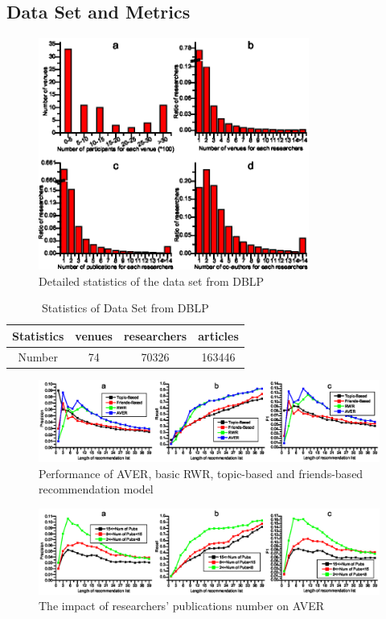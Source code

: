 \documentclass{sig-alternate-2013}
\begin{document}
\subsection{Data Set and Metrics}
\begin{figure}[t]
\centering
\includegraphics [width=3.5in]{Fig3.eps}
\caption{Detailed statistics of the data set from DBLP}
\label{fig3}
\end{figure}
\begin{table}
\renewcommand{\arraystretch}{1.2}
\centering
\caption{Statistics of Data Set from DBLP}
\label{table1}
\begin{tabular}{|c|c|c|c|} \hline
Statistics &venues&researchers&articles\\ \hline
Number & 74 & 70326 &163446 \\
\hline\end{tabular}
\end{table}
\begin{figure}[hbt]
\centering
\includegraphics [width=\textwidth]{Fig4.eps}
\caption{Performance of AVER, basic RWR, topic-based and friends-based recommendation model}
\label{fig4}
\end{figure}
\begin{figure}[hbt]
\centering
\includegraphics [width=\textwidth]{Fig5.eps}
\caption{The impact of researchers' publications number on AVER}
\label{fig5}
\end{figure}
\end{document}
